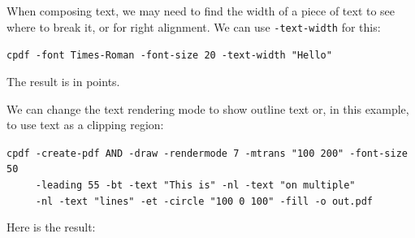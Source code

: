 \documentclass{book}
\begin{document}
\noindent When composing text, we may need to find the width of a piece of text to see where to break it, or for right alignment. We can use \texttt{-text-width} for this:

\begin{framed}
 \noindent\small\verb?cpdf -font Times-Roman -font-size 20 -text-width "Hello"?
\end{framed}

\noindent The result is in points.

We can change the text rendering mode to show outline text or, in this example, to use text as a clipping region:

\begin{framed}
 \noindent\small\verb?cpdf -create-pdf AND -draw -rendermode 7 -mtrans "100 200" -font-size 50?\\
 \noindent\small\verb?     -leading 55 -bt -text "This is" -nl -text "on multiple"?\\
 \noindent\small\verb?     -nl -text "lines" -et -circle "100 0 100" -fill -o out.pdf?
\end{framed}

\noindent Here is the result:
\end{document}
